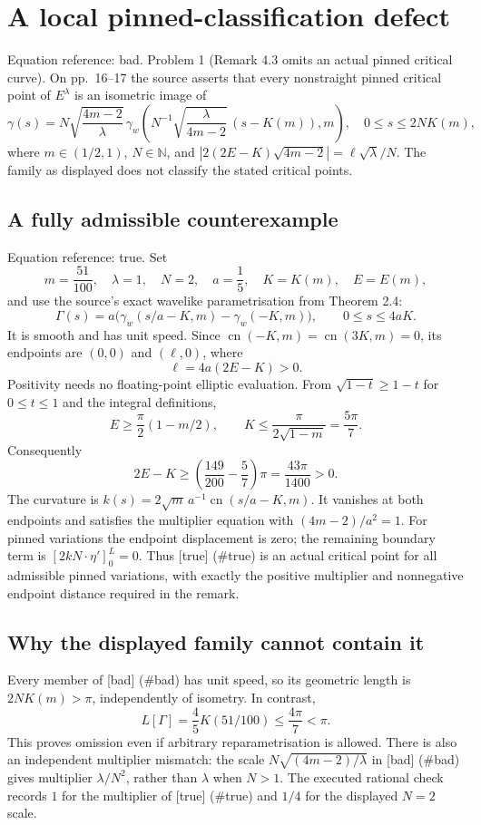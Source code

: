 \documentclass[10pt]{article}
\begin{document}
\section*{A local pinned-classification defect}
Equation reference: bad. Problem 1 (Remark 4.3 omits an actual pinned critical curve).  On pp. 16–17 the source asserts that every nonstraight pinned critical point of \(E^\lambda\) is an isometric image of \[
 \gamma(s)=N\sqrt{\frac{4m-2}{\lambda}}\,
 \gamma_w\!\left(
 N^{-1}\sqrt{\frac{\lambda}{4m-2}}\,(s-K(m)),m\right),
 \quad 0\leq s\leq2NK(m),\] where \(m\in(1/2,1)\), \(N\in\mathbb N\), and \(|2(2E-K)\sqrt{4m-2}|=\ell\sqrt\lambda/N\). The family as displayed does not classify the stated critical points.\par
\subsection*{A fully admissible counterexample}
Equation reference: true. Set \[m=\frac{51}{100},\quad \lambda=1,\quad N=2,\quad a=\frac15,\quad
 K=K(m),\quad E=E(m),\] and use the source’s exact wavelike parametrisation from Theorem 2.4: \[
 \Gamma(s)=a\bigl(\gamma_w(s/a-K,m)-\gamma_w(-K,m)\bigr),
 \qquad 0\leq s\leq 4aK.\] It is smooth and has unit speed. Since \(\operatorname{cn}(-K,m)
=\operatorname{cn}(3K,m)=0\), its endpoints are \((0,0)\) and \((\ell,0)\), where \[\ell=4a(2E-K)>0.\] Positivity needs no floating-point elliptic evaluation. From \(\sqrt{1-t}\geq1-t\) for \(0\leq t\leq1\) and the integral definitions, \[E\geq\frac\pi2(1-m/2),\qquad
 K\leq\frac{\pi}{2\sqrt{1-m}}=\frac{5\pi}{7}.\] Consequently \[2E-K\geq \left(\frac{149}{200}-\frac57\right)\pi
 =\frac{43\pi}{1400}>0.\] The curvature is \(k(s)=2\sqrt m\,a^{-1}\operatorname{cn}(s/a-K,m)\). It vanishes at both endpoints and satisfies the multiplier equation with \((4m-2)/a^2=1\). For pinned variations the endpoint displacement is zero; the remaining boundary term is \([2kN\cdot\eta']_0^L=0\). Thus [true] (\#true) is an actual critical point for all admissible pinned variations, with exactly the positive multiplier and nonnegative endpoint distance required in the remark.\par
\subsection*{Why the displayed family cannot contain it}
Every member of [bad] (\#bad) has unit speed, so its geometric length is \(2NK(m)>\pi\), independently of isometry. In contrast, \[L[\Gamma]=\frac45K(51/100)\leq\frac{4\pi}{7}<\pi.\] This proves omission even if arbitrary reparametrisation is allowed. There is also an independent multiplier mismatch: the scale \(N\sqrt{(4m-2)/\lambda}\) in [bad] (\#bad) gives multiplier \(\lambda/N^2\), rather than \(\lambda\) when \(N>1\). The executed rational check records \(1\) for the multiplier of [true] (\#true) and \(1/4\) for the displayed \(N=2\) scale.\par
\end{document}
